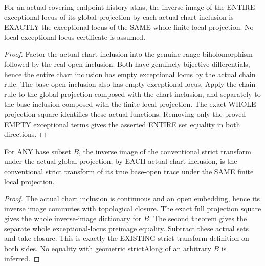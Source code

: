 \begin{theorem}
\label{hir:sharp-actual-global-exceptional-local-dictionary}
\leanok
For an actual covering endpoint-history atlas, the inverse image of the
ENTIRE exceptional locus of its global projection by each actual chart
inclusion is EXACTLY the exceptional locus of the SAME whole finite
local projection. No local exceptional-locus certificate is assumed.
\end{theorem}
\begin{proof}
Factor the actual chart inclusion into the genuine range
biholomorphism followed by the real open inclusion. Both have genuinely
bijective differentials, hence the entire chart inclusion has empty
exceptional locus by the actual chain rule. The base open inclusion
also has empty exceptional locus. Apply the chain rule to the global
projection composed with the chart inclusion, and separately to the
base inclusion composed with the finite local projection. The exact
WHOLE projection square identifies these actual functions. Removing
only the proved EMPTY exceptional terms gives the asserted ENTIRE
set equality in both directions.
\end{proof}

\begin{theorem}
\label{hir:sharp-actual-global-conventional-strict-local-dictionary}
\leanok
For ANY base subset $B$, the inverse image of the conventional strict
transform under the actual global projection, by EACH actual chart
inclusion, is the conventional strict transform of its true base-open
trace under the SAME finite local projection.
\end{theorem}
\begin{proof}
The actual chart inclusion is continuous and an open embedding, hence
its inverse image commutes with topological closure. The exact full
projection square gives the whole inverse-image dictionary for $B$.
The second theorem gives the separate whole exceptional-locus
preimage equality. Subtract these actual sets and take closure. This
is exactly the EXISTING strict-transform definition on both sides.
No equality with geometric strictAlong of an arbitrary $B$ is inferred.
\end{proof}

